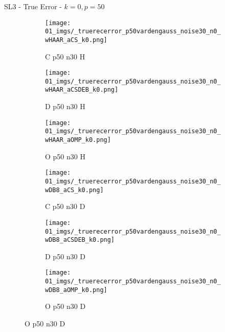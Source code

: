 \begin{frame}{SL3 - True Error - $k=0,p=50$}{}
\begin{figure}
\vspace{5pt}

\begin{subfigure}{0.13\textwidth}
\texttt{[image: 01\_imgs/\_truerecerror\_p50vardengauss\_noise30\_n0\_wHAAR\_aCS\_k0.png]}
\caption*{\tiny C p50 n30 H}
\end{subfigure}
\begin{subfigure}{0.13\textwidth}
\texttt{[image: 01\_imgs/\_truerecerror\_p50vardengauss\_noise30\_n0\_wHAAR\_aCSDEB\_k0.png]}
\caption*{\tiny D p50 n30 H}
\end{subfigure}
\begin{subfigure}{0.13\textwidth}
\texttt{[image: 01\_imgs/\_truerecerror\_p50vardengauss\_noise30\_n0\_wHAAR\_aOMP\_k0.png]}
\caption*{\tiny O p50 n30 H}
\end{subfigure}
\begin{subfigure}{0.13\textwidth}
\texttt{[image: 01\_imgs/\_truerecerror\_p50vardengauss\_noise30\_n0\_wDB8\_aCS\_k0.png]}
\caption*{\tiny C p50 n30 D}
\end{subfigure}
\begin{subfigure}{0.13\textwidth}
\texttt{[image: 01\_imgs/\_truerecerror\_p50vardengauss\_noise30\_n0\_wDB8\_aCSDEB\_k0.png]}
\caption*{\tiny D p50 n30 D}
\end{subfigure}
\begin{subfigure}{0.13\textwidth}
\texttt{[image: 01\_imgs/\_truerecerror\_p50vardengauss\_noise30\_n0\_wDB8\_aOMP\_k0.png]}
\caption*{\tiny O p50 n30 D}
\end{subfigure}
\end{figure}
\end{frame}


